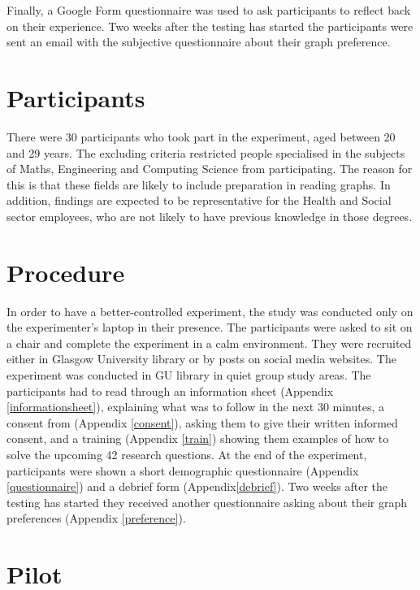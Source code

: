 \documentclass{l4proj}
\begin{document}
Finally, a Google Form questionnaire was used to ask participants to reflect back on their experience. Two weeks after the testing has started the participants were sent an email with the subjective questionnaire about their graph preference. 

\section{Participants}
There were 30 participants who took part in the experiment, aged between 20 and 29 years. The excluding criteria restricted people specialised in the subjects of Maths, Engineering and Computing Science from participating. The reason for this is that these fields are likely to include preparation in reading graphs. In addition, findings are expected to be representative for the Health and Social sector employees, who are not likely to have previous knowledge in those degrees.

\section{Procedure}

In order to have a better-controlled experiment, the study was conducted only on the experimenter's laptop in their presence. The participants were asked to sit on a chair and complete the experiment in a calm environment. They were recruited either in Glasgow University library or by posts on social media websites. The experiment was conducted in GU library in quiet group study areas. The participants had to read through an information sheet (Appendix \ref{informationsheet}), explaining what was to follow in the next 30 minutes, a consent from (Appendix \ref{consent}), asking them to give their written informed consent, and a training (Appendix \ref{train}) showing them examples of how to solve the upcoming 42 research questions. At the end of the experiment, participants were shown a short demographic questionnaire (Appendix \ref{questionnaire}) and a debrief form (Appendix\ref{debrief}). Two weeks after the testing has started they received another questionnaire asking about their graph preferences (Appendix \ref{preference}).


\section{Pilot}
\end{document}
